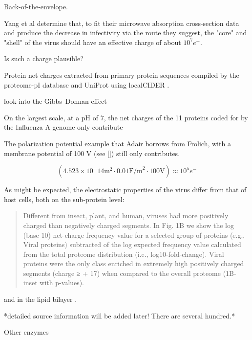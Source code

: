 \documentclass[paper.tex]{subfiles}
\begin{document}
Back-of-the-envelope.

Yang et al determine that, to fit their microwave absorption cross-section data and produce the decrease in infectivity via the route they suggest, the "core" and "shell" of the virus should have an effective charge of about $10^7 e^-$. 

Is such a charge plausible?

Protein net charges extracted from primary protein sequences compiled by the proteome-pI database \cite{ProteomepI2017} and UniProt using localCIDER \cite{CIDER2017} . 


look into the Gibbs–Donnan effect


On the largest scale, at a pH of 7, the net charges of the 11 proteins coded for by the Influenza A genome only contribute 


The polarization potential example that Adair borrows from Frolich, with a membrane potential of 100 V (see []) still only contributes.  

$$(4.523 \times 10^-14 \text{m}^2 \cdot 0.01 \text{F/m}^2 \cdot 100 \text{V}) \approx 10^5 e^- $$




As might be expected, the electrostatic properties of the virus differ from that of host cells, both \cite{Icosahedral2019} on the sub-protein level:

\begin{quote}
	Different from insect, plant, and human, viruses had more positively charged than negatively charged segments. In Fig. 1B we show the log (base 10) net-charge frequency value for a selected group of proteins (e.g., Viral proteins) subtracted of the log expected frequency value calculated from the total proteome distribution (i.e., log10-fold-change). Viral proteins were the only class enriched in extremely high positively charged segments (charge ≥ + 17) when compared to the overall proteome (1B-inset with p-values).
\end{quote}

and in the lipid bilayer \cite{Lipid2015} \footnotemark.


*detailed source information will be added later! There are several hundred.*



Other enzymes
\end{document}
